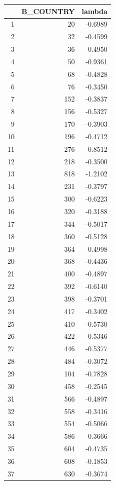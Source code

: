 \documentclass{amsart}
\begin{document}
\begin{longtable}{rrr}
  \hline
 & B\_COUNTRY & lambda \\ 
  \hline
1 & 20 & -0.6989 \\ 
  2 & 32 & -0.4599 \\ 
  3 & 36 & -0.4950 \\ 
  4 & 50 & -0.9361 \\ 
  5 & 68 & -0.4828 \\ 
  6 & 76 & -0.3450 \\ 
  7 & 152 & -0.3837 \\ 
  8 & 156 & -0.5327 \\ 
  9 & 170 & -0.3903 \\ 
  10 & 196 & -0.4712 \\ 
  11 & 276 & -0.8512 \\ 
  12 & 218 & -0.3500 \\ 
  13 & 818 & -1.2102 \\ 
  14 & 231 & -0.3797 \\ 
  15 & 300 & -0.6223 \\ 
  16 & 320 & -0.3188 \\ 
  17 & 344 & -0.5017 \\ 
  18 & 360 & -0.5128 \\ 
  19 & 364 & -0.4998 \\ 
  20 & 368 & -0.4436 \\ 
  21 & 400 & -0.4897 \\ 
  22 & 392 & -0.6140 \\ 
  23 & 398 & -0.3701 \\ 
  24 & 417 & -0.3402 \\ 
  25 & 410 & -0.5730 \\ 
  26 & 422 & -0.5346 \\ 
  27 & 446 & -0.5377 \\ 
  28 & 484 & -0.3072 \\ 
  29 & 104 & -0.7828 \\ 
  30 & 458 & -0.2545 \\ 
  31 & 566 & -0.4897 \\ 
  32 & 558 & -0.3416 \\ 
  33 & 554 & -0.5066 \\ 
  34 & 586 & -0.3666 \\ 
  35 & 604 & -0.4735 \\ 
  36 & 608 & -0.1853 \\ 
  37 & 630 & -0.3674 \\ 

\end{longtable}
\end{document}
